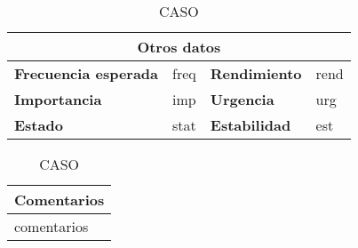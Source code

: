 \begin{table}[H]
\vspace{1cm}

\begin{tabular}{|m{3.72cm}|m{3.72cm}|m{3.72cm}|m{3.72cm}|}
\hline
\multicolumn{4}{|c|}{\textbf{Otros datos}} \\
\hline
\textbf{Frecuencia esperada} & freq & \textbf{Rendimiento} & rend \\
\hline
\textbf{Importancia} & imp & \textbf{Urgencia} & urg \\
\hline
\textbf{Estado} & stat & \textbf{Estabilidad} & est \\
\hline
\end{tabular}

\vspace{1cm}

\begin{tabular}{|m{16.2cm}|}
\hline
\textbf{Comentarios} \\
\hline
comentarios \\
\hline
\end{tabular}

\caption{CASO}

\end{table}